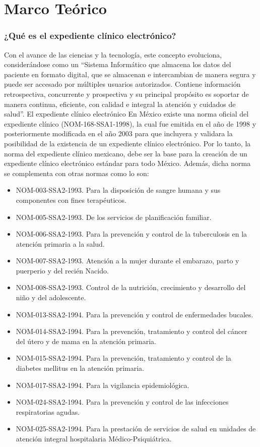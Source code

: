 \chapter{Marco Teórico}

\subsection{¿Qué es el expediente clínico electrónico?}

Con el avance de las ciencias y la tecnología, este concepto evoluciona, considerándose como un “Sistema Informático que almacena los datos del paciente en formato digital, que se almacenan e intercambian de manera segura y puede ser accesado por múltiples usuarios autorizados. Contiene información retrospectiva, concurrente y prospectiva y su principal propósito es soportar de manera continua, eficiente, con calidad e integral la atención y cuidados de salud”. \cite{marco1}
El expediente clínico electrónico
En México existe una norma oficial del expediente clínico (NOM-168-SSA1-1998), la cual fue emitida en el año de 1998 y posteriormente modificada en el año 2003 para que incluyera y validara la posibilidad de la existencia de un expediente clínico electrónico. Por lo tanto, la norma del expediente clínico mexicano, debe ser la base para la creación de un expediente clínico electrónico estándar para todo México. Además, dicha norma se complementa con otras normas como lo son:
\begin{itemize}
  \item NOM-003-SSA2-1993. Para la disposición de sangre humana y sus componentes con fines terapéuticos.
  \item NOM-005-SSA2-1993. De los servicios de planificación familiar.
  \item NOM-006-SSA2-1993. Para la prevención y control de la tuberculosis en la atención primaria a la salud.
  \item NOM-007-SSA2-1993. Atención a la mujer durante el embarazo, parto y puerperio y del recién Nacido.
  \item NOM-008-SSA2-1993. Control de la nutrición, crecimiento y desarrollo del niño y del adolescente.
  \item NOM-013-SSA2-1994. Para la prevención y control de enfermedades bucales.
  \item NOM-014-SSA2-1994. Para la prevención, tratamiento y control del cáncer del útero y de mama en la atención primaria.
  \item NOM-015-SSA2-1994. Para la prevención, tratamiento y control de la diabetes mellitus en la atención primaria.
  \item NOM-017-SSA2-1994. Para la vigilancia epidemiológica.
  \item NOM-024-SSA2-1994. Para la prevención y control de las infecciones respiratorias agudas.
  \item NOM-025-SSA2-1994. Para la prestación de servicios de salud en unidades de atención integral hospitalaria Médico-Psiquiátrica. \cite{marco2}

\end{itemize}

